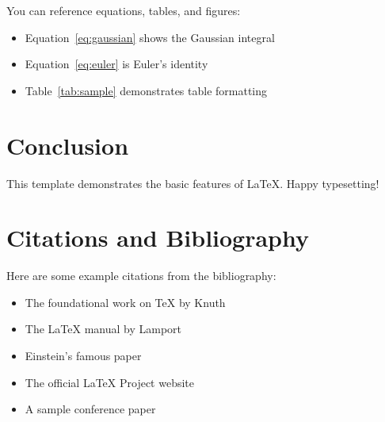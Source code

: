 \documentclass[12pt,a4paper]{article}
\begin{document}
You can reference equations, tables, and figures:
\begin{itemize}
    \item Equation~\ref{eq:gaussian} shows the Gaussian integral
    \item Equation~\ref{eq:euler} is Euler's identity
    \item Table~\ref{tab:sample} demonstrates table formatting
\end{itemize}

\section{Conclusion}

This template demonstrates the basic features of \LaTeX{}. Happy typesetting!

\lipsum[2]

\section{Citations and Bibliography}

Here are some example citations from the bibliography:

\begin{itemize}
    \item The foundational work on \TeX{} by Knuth~\cite{knuth1984}
    \item The \LaTeX{} manual by Lamport~\cite{lamport1994}
    \item Einstein's famous paper~\cite{einstein1905}
    \item The official \LaTeX{} Project website~\cite{latexproject}
    \item A sample conference paper~\cite{sample2023}
\end{itemize}



\end{document}
